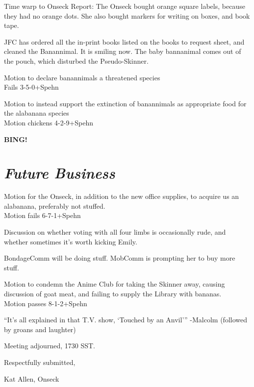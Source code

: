 \documentclass[12pt]{article}
\newcommand{\bing}{{\bf BING!} }
\newcommand{\goto}[1]{\bing \vskip 12pt \section*{{\em{#1}}}}
\begin{document}
Time warp to Onseck Report: The Onseck bought orange square labels,
because they had no orange dots. She also bought markers for writing
on boxes, and book tape.

JFC has ordered all the in-print books listed on the books to request
sheet, and cleaned the Banannimal. It is smiling now.
The baby bannanimal comes out of the pouch, which disturbed the
Pseudo-Skinner.

Motion to declare banannimals a threatened species\\
Fails 3-5-0+Spehn

Motion to instead support the extinction of banannimals as appropriate
food for the alabanana species\\
Motion chickens 4-2-9+Spehn

\goto{Future Business}
Motion for the Onseck, in addition to the new office supplies, to
acquire us an alabanana, preferably not stuffed.\\
Motion fails 6-7-1+Spehn

Discussion on whether voting with all four limbs is occasionally rude,
and whether sometimes it's worth kicking Emily.

BondageComm will be doing stuff. MobComm is prompting her to buy more
stuff.

Motion to condemn the Anime Club for taking the Skinner away, causing
discussion of goat meat, and failing to supply the Library with bananas.\\
Motion passes 8-1-2+Spehn

``It's all explained in that T.V. show, `Touched by an Anvil'''
-Malcolm
(followed by groans and laughter)

\vspace{12pt}

\noindent
Meeting adjourned, 1730 SST.

\vspace{18pt}

\centerline{Respectfully submitted,}
\centerline{Kat Allen,  Onseck}
\end{document}
